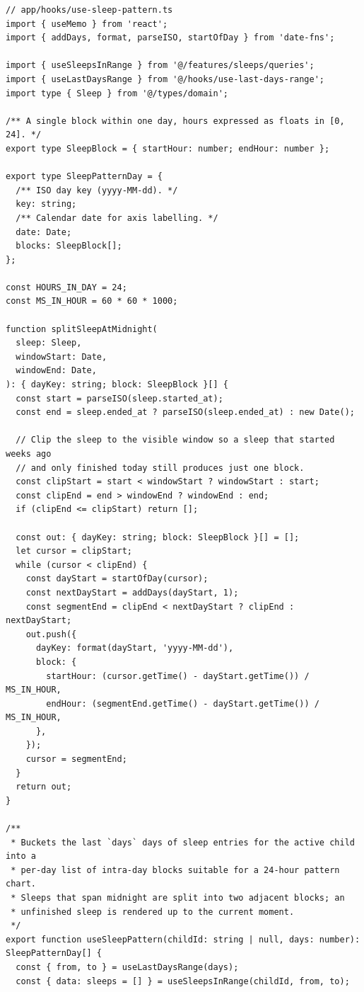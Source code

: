 \documentclass[%
  ukrainian, utf8, columnvii, simple,
  hpadding=10mm, vpadding=10mm, reduceheight=2mm,
  floatsection,
]{eskdtext}
\begin{document}
{%
\begin{verbatim}
// app/hooks/use-sleep-pattern.ts
import { useMemo } from 'react';
import { addDays, format, parseISO, startOfDay } from 'date-fns';

import { useSleepsInRange } from '@/features/sleeps/queries';
import { useLastDaysRange } from '@/hooks/use-last-days-range';
import type { Sleep } from '@/types/domain';

/** A single block within one day, hours expressed as floats in [0, 24]. */
export type SleepBlock = { startHour: number; endHour: number };

export type SleepPatternDay = {
  /** ISO day key (yyyy-MM-dd). */
  key: string;
  /** Calendar date for axis labelling. */
  date: Date;
  blocks: SleepBlock[];
};

const HOURS_IN_DAY = 24;
const MS_IN_HOUR = 60 * 60 * 1000;

function splitSleepAtMidnight(
  sleep: Sleep,
  windowStart: Date,
  windowEnd: Date,
): { dayKey: string; block: SleepBlock }[] {
  const start = parseISO(sleep.started_at);
  const end = sleep.ended_at ? parseISO(sleep.ended_at) : new Date();

  // Clip the sleep to the visible window so a sleep that started weeks ago
  // and only finished today still produces just one block.
  const clipStart = start < windowStart ? windowStart : start;
  const clipEnd = end > windowEnd ? windowEnd : end;
  if (clipEnd <= clipStart) return [];

  const out: { dayKey: string; block: SleepBlock }[] = [];
  let cursor = clipStart;
  while (cursor < clipEnd) {
    const dayStart = startOfDay(cursor);
    const nextDayStart = addDays(dayStart, 1);
    const segmentEnd = clipEnd < nextDayStart ? clipEnd : nextDayStart;
    out.push({
      dayKey: format(dayStart, 'yyyy-MM-dd'),
      block: {
        startHour: (cursor.getTime() - dayStart.getTime()) / MS_IN_HOUR,
        endHour: (segmentEnd.getTime() - dayStart.getTime()) / MS_IN_HOUR,
      },
    });
    cursor = segmentEnd;
  }
  return out;
}

/**
 * Buckets the last `days` days of sleep entries for the active child into a
 * per-day list of intra-day blocks suitable for a 24-hour pattern chart.
 * Sleeps that span midnight are split into two adjacent blocks; an
 * unfinished sleep is rendered up to the current moment.
 */
export function useSleepPattern(childId: string | null, days: number): SleepPatternDay[] {
  const { from, to } = useLastDaysRange(days);
  const { data: sleeps = [] } = useSleepsInRange(childId, from, to);


\end{verbatim}}
\end{document}
